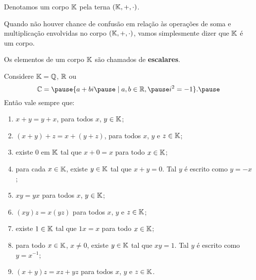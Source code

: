\documentclass{beamer}
\begin{document}
    \begin{frame}
        Denotamos um corpo $\mathbb{K}$ pela terna $(\mathbb{K}, +, \cdot)$. \pause

        \vspace{.3cm}

        Quando n\~ao houver chance de confus\~ao em rela\c{c}\~ao \`as opera\c{c}\~oes de soma e multiplica\c{c}\~ao envolvidas no corpo $(\mathbb{K}, +, \cdot)$, \pause vamos simplesmente dizer que $\mathbb{K}$ \'e um corpo. \pause

        \vspace{.3cm}

        Os elementos de um corpo $\mathbb{K}$ s\~ao chamados de \textbf{escalares}.
    \end{frame}

    \begin{frame}

        Considere $\mathbb{K} = \mathbb{Q}$, \pause $\mathbb{R}$ \pause ou
        \[
    	    \complex = \pause \{a + bi \pause \mid a, b \in \real, \pause i^2 = -1\}.\pause
        \]
        Então vale sempre que:\pause

        \begin{enumerate}[label={\roman*})]
	    \item $x + y = y + x$, para todos $x$, $y \in \mathbb{K}$;\pause
            \item $(x + y) + z = x + (y + z)$, para todos $x$, $y$ e $z \in \mathbb{K}$;\pause
            \item existe $0$ em $\mathbb{K}$ tal que $x + 0 = x$ para todo $x \in \mathbb{K}$;\pause
            \item para cada $x \in \mathbb{K}$, existe $y \in \mathbb{K}$ tal que $x + y = 0$. Tal $y$ é escrito como $y = -x$;\pause
            \item $xy = yx$ para todos $x$, $y \in \mathbb{K}$;\pause
            \item $(xy)z = x(yz)$ para todos $x$, $y$ e $z \in \mathbb{K}$;\pause
            \item existe $1 \in \mathbb{K}$ tal que $1x = x$ para todo $x \in \mathbb{K}$;\pause
            \item para todo $x \in \mathbb{K}$, $x \ne 0$, existe $y \in \mathbb{K}$ tal que $xy =1$. Tal $y$ é escrito como $y = x^{-1}$;\pause
            \item $(x + y)z = xz + yz$ para todos $x$, $y$ e $z \in \mathbb{K}$.\pause
        \end{enumerate}
    \end{frame}
\end{document}
